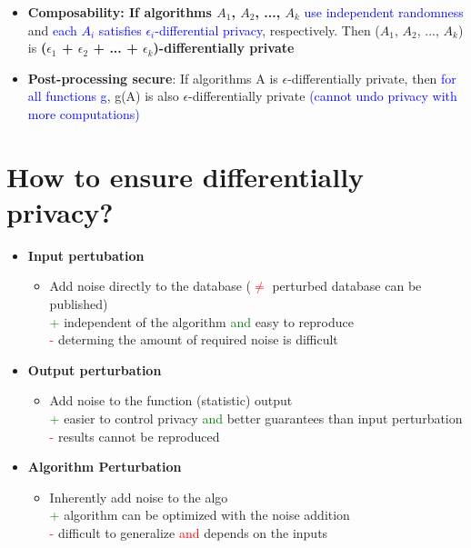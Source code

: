 \documentclass[11pt]{article}
\begin{document}
\begin{itemize}
	\item \textbf{Composability: If algorithms $A_1$, $A_2$, ..., $A_k$} \textcolor{blue}{use independent randomness} and \textcolor{blue}{each \textbf{$A_i$} satisfies $\epsilon_i$-differential privacy}, respectively. Then ($A_1$, $A_2$, ..., $A_k$) is \textbf{($\epsilon_1$ + $\epsilon_2$ + ... + $\epsilon_k$)-differentially private}
	\item \textbf{Post-processing secure}: If algorithms A is $\epsilon$-differentially private, then \textcolor{blue}{for all functions g}, g(A) is also $\epsilon$-differentially private  \textcolor{blue}{(cannot undo privacy with more computations)}
\end{itemize}

\section*{How to ensure differentially privacy?}

\begin{itemize}
	\item \textbf{Input pertubation}
		\begin{itemize}
			\item Add noise directly to the database (\textcolor{red}{$\neq$} perturbed database can be published) \\
			\textcolor{green}{+} independent of the algorithm \textcolor{green}{and} easy to reproduce \\
			\textcolor{red}{-} determing the amount of required noise is difficult
		\end{itemize}
	\item \textbf{Output perturbation}
		\begin{itemize}
			\item Add noise to the function (statistic) output \\
				\textcolor{green}{+} easier to control privacy \textcolor{green}{and} better guarantees than input perturbation \\
				\textcolor{red}{-} results cannot be reproduced
		\end{itemize}
	\item \textbf{Algorithm Perturbation}
		\begin{itemize}
			\item Inherently add noise to the algo \\
			\textcolor{green}{+} algorithm can be optimized with the noise addition \\
			\textcolor{red}{-} difficult to generalize \textcolor{red}{and} depends on the inputs
		\end{itemize}
\end{itemize}
\end{document}
